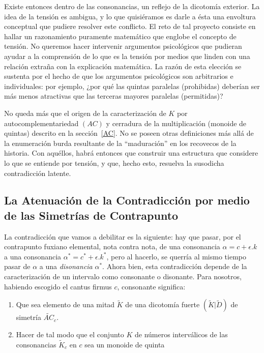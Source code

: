 \documentclass[letterpaper,12pt]{book}
\theoremstyle{definition} \newtheorem{Def}{Definición}[chapter]
\theoremstyle{definition} \newtheorem{Teo}{Teorema}[chapter]
\theoremstyle{definition} \newtheorem{Pro}{Proposición}[chapter]
\theoremstyle{definition} \newtheorem{Lema}{Lema}[chapter]
\begin{document}
Existe entonces dentro de las consonancias, un reflejo de la dicotomía exterior. La idea de la tensión es ambigua, y lo que quisiéramos es darle a ésta una envoltura conceptual que pudiere resolver este conflicto. El reto de tal proyecto consiste en hallar un razonamiento puramente matemático que englobe el concepto de tensión. No queremos hacer intervenir argumentos psicológicos que pudieran ayudar a la comprensión de lo que es la tensión por medios que linden con una relación extraña con la explicación matemática. La razón de esta elección se sustenta por el hecho de que los argumentos psicológicos son arbitrarios e individuales: por ejemplo, ¿por qué las quintas paralelas (prohibidas) deberían ser más menos atractivas que las terceras mayores paralelas (permitidas)?

No queda más que el origen de la caracterización de $K$ por autocomplementariedad $(AC)$ y cerradura de la multiplicación (monoide de quintas) descrito en la sección~\ref{AC}. No se poseen otras definiciones más allá de la enumeración burda resultante de la ``maduración'' en los recovecos de la historia. Con aquéllos, habrá entonces que construir una estructura que considere lo que se entiende por tensión, y que, hecho esto, resuelva la susodicha contradicción latente.

\subsection[La Atenuación de la Contradicción]{La Atenuación de la Contradicción por medio de las Simetrías de Contrapunto}\label{Atenuacion}

La contradicción que vamos a debilitar es la siguiente: hay que pasar, por el contrapunto fuxiano elemental, nota contra nota, de una consonancia $\alpha=c+ \epsilon.k$ a una consonancia $\alpha^*=c^*+ \epsilon.k^*$, pero al hacerlo, se querría al mismo tiempo pasar de $\alpha$ a una \emph{disonancia} $\alpha^*$.  Ahora bien, esta contradicción depende de la caracterización de un intervalo como consonante o disonante. Para nosotros, habiendo escogido el cantus firmus $c$, consonante significa:

\begin{enumerate}
\item Que sea elemento de una mitad $\tilde{K}$ de una dicotomía fuerte $(\tilde{K}| \tilde{D})$ de simetría $\widetilde{AC}_c$.
\item Hacer de tal modo que el conjunto $K$ de números interválicos de las consonancias $\tilde{K}_c$ en $c$ sea un monoide de quinta
\end{enumerate}
\end{document}
